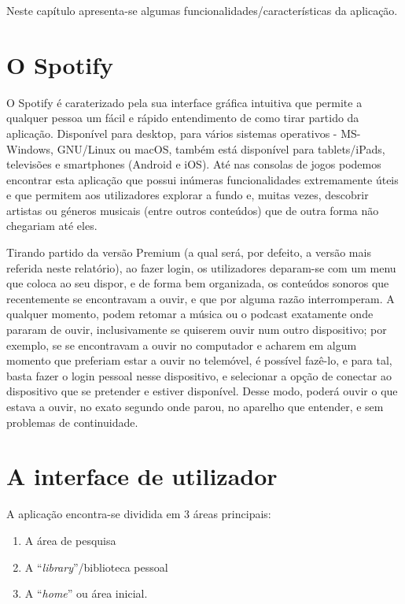 \documentclass{report}
\begin{document}
Neste capítulo apresenta-se algumas funcionalidades/características da aplicação.

\section{O Spotify}
O Spotify é caraterizado pela sua interface gráfica intuitiva que permite a qualquer pessoa um fácil e rápido entendimento de como tirar partido da aplicação. Disponível para desktop, para vários sistemas operativos - MS-Windows, GNU/Linux ou macOS, também está disponível para tablets/iPads, televisões e smartphones (Android e iOS). Até nas consolas de jogos podemos encontrar esta aplicação que possui inúmeras funcionalidades extremamente úteis e que permitem aos utilizadores explorar a fundo e, muitas vezes, descobrir artistas ou géneros musicais (entre outros conteúdos) que de outra forma não chegariam até eles.

Tirando partido da versão Premium (a qual será, por defeito, a versão mais referida neste relatório), ao fazer login, os utilizadores deparam-se com um menu que coloca ao seu dispor, e de forma bem organizada, os conteúdos sonoros que recentemente se encontravam a ouvir, e que por alguma razão interromperam. A qualquer momento, podem retomar a música ou o podcast exatamente onde pararam de ouvir, inclusivamente se quiserem ouvir num outro dispositivo; por exemplo, se se encontravam a ouvir no computador e acharem em algum momento que preferiam estar a ouvir no telemóvel, é possível fazê-lo, e para tal, basta fazer o login pessoal nesse dispositivo, e selecionar a opção de conectar ao dispositivo que se pretender e estiver disponível. Desse modo, poderá ouvir o que estava a ouvir, no exato segundo onde parou, no aparelho que entender, e sem problemas de continuidade.

\section{A interface de utilizador}
A aplicação encontra-se dividida em 3 áreas principais: 
\begin{enumerate}
    \item A área de pesquisa
    \item A ``\textit{library}''/biblioteca pessoal
    \item A ``\textit{home}'' ou área inicial.%
\end{enumerate}
\end{document}
